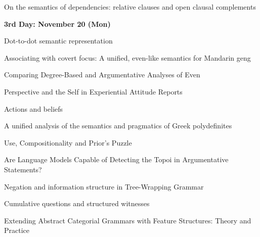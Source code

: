 \documentclass[12pt]{jarticle}
\begin{document}
      {On the semantics of dependencies: relative clauses and open clausal complements}
      {}







\noindent\textbf{\large 
3rd Day: November 20 (Mon)
}\\







  
      {Dot-to-dot semantic representation}
      {}
  
      {Associating with covert focus: A unified, even-like semantics for Mandarin geng}
      {}
  
      {Comparing Degree-Based and Argumentative Analyses of Even}
      {}




  
      {Perspective and the Self in Experiential Attitude Reports}
      {}
  
      {Actions and beliefs}
      {}
  
      {A unified analysis of the semantics and pragmatics of Greek polydefinites}
      {}







  
      {Use, Compositionality and Prior's Puzzle}
      {}
  
      {Are Language Models Capable of Detecting the Topoi in Argumentative Statements?}
      {}
  
      {Negation and information structure in Tree-Wrapping Grammar}
      {}







  
      {Cumulative questions and structured witnesses}
      {}
  
      {Extending Abstract Categorial Grammars with Feature Structures: Theory and Practice}
      {}






  
\end{document}
